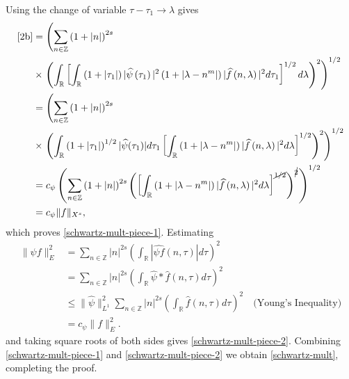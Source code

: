 \documentclass[12pt,reqno]{amsart}
\numberwithin{equation}{section}  %
\numberwithin{figure}{section}
\newcommand{\rr}{\mathbb{R}}
\newcommand{\zz}{\mathbb{Z}}
\newcommand{\wh}{\widehat}
\theoremstyle{plain}
\theoremstyle{definition}
\theoremstyle{remark}
\begin{document}
%
%
Using the change of variable $\tau - \tau_1 \to \lambda$ gives
%
%
\begin{equation*}
	\begin{split}
		\eqref{2b}
		& = \left( \sum_{n \in \zz} \left (1 + |n| \right )^{2s}\right.
		\\
		& \times \left.  \left( \int_\rr \left[
		\int_\rr \left( 1 + | \tau_1 | \right) | \wh{\psi}\left( \tau_1
		\right) |^2 \left( 1 + | \lambda - n^{m} | \right) | \wh{f} \left( n,
		\lambda
		\right)|^2 d \tau_1 \right]^{1/2} d \lambda \right)^2 \right)^{1/2}
		\\
		& =  \left( \sum_{n \in \zz} \left (1 + |n| \right )^{2s} \right.
		\\
		& \times \left. \left( \int_\rr \left( 1 + |
		\tau_1 |
		\right)^{1/2} | \wh{\psi}(\tau_1) | d \tau_1 \left[ \int_\rr \left( 1 + |
		\lambda - n^{m} |
		\right) | \wh{f}\left( n, \lambda \right) |^2 d \lambda \right]^{1/2}
		\right)^2 \right)^{1/2}
		\\
		& = c_{\psi} \left( \sum_{n \in \zz} \left (1 + |n| \right )^{2s} \left( \left[ \int_\rr
		\left( 1 + | \lambda - n^{m} | \right) | \wh{f}\left( n, \lambda
		\right) |^2 d \lambda
		\right]^{\cancel{1/2}} \right)^{\cancel{2}} \right)^{1/2}
		\\
		& = c_{\psi} \|f\|_{X^s},
	\end{split}
\end{equation*}
%
%
which proves \eqref{schwartz-mult-piece-1}.
Estimating 
%
%
\begin{equation*}
\begin{split}
  \| \psi f \|_{E}^{2}
  & = \sum_{n \in \zz} | n |^{2s} \left( \int_{\rr} |
  \wh{\psi f}(n, \tau)
  | d \tau \right)^{2}
  \\
  & = \sum_{n \in \zz} | n |^{2s} \left( \int_{\rr} \wh{\psi} * \wh{f}
  (n, \tau) d \tau \right)^{2}
  \\
  & \le \| \wh{\psi} \|_{L^1}^{2} \sum_{n \in \zz} | n |^{2s} \left(
  \int_{\rr} \wh{f}(n, \tau) d \tau
  \right)^{2} \quad \text{(Young's Inequality)}
  \\
  & = c_{\psi} \| f \|_{E}^2.
\end{split}
\end{equation*}
%
%
and taking square roots of both sides gives \eqref{schwartz-mult-piece-2}. Combining
\eqref{schwartz-mult-piece-1} and \eqref{schwartz-mult-piece-2} we obtain
\eqref{schwartz-mult}, completing the proof.  \qquad \qedsymbol
%
%
\end{document}
